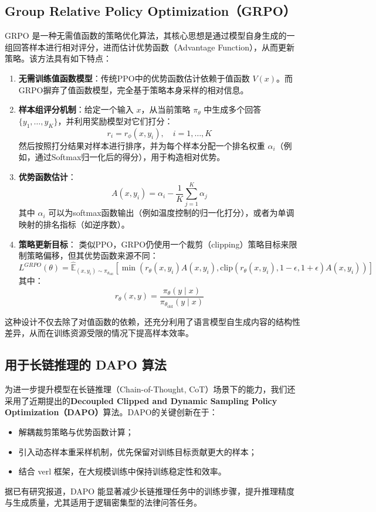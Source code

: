 \documentclass{pkuthesis}
\begin{document}
\subsection{Group Relative Policy Optimization（GRPO）}
GRPO 是一种无需值函数的策略优化算法，其核心思想是通过模型自身生成的一组回答样本进行相对评分，进而估计优势函数（Advantage Function），从而更新策略。该方法具有如下特点：
\begin{enumerate}
    \item \textbf{无需训练值函数模型}：传统PPO中的优势函数估计依赖于值函数 $V(x)$。而GRPO摒弃了值函数模型，完全基于策略本身采样的相对信息。
    \item \textbf{样本组评分机制}：给定一个输入 $x$，从当前策略 $\pi_{\theta}$ 中生成多个回答 $\{y_1, \dots, y_K\}$，并利用奖励模型对它们打分：
    $$ r_i = r_{\phi}(x, y_i), \quad i = 1, \dots, K $$
    然后按照打分结果对样本进行排序，并为每个样本分配一个排名权重 $\alpha_i$（例如，通过Softmax归一化后的得分），用于构造相对优势。
    \item \textbf{优势函数估计}：
    $$ A(x, y_i) = \alpha_i - \frac{1}{K} \sum_{j=1}^K \alpha_j $$
    其中 $\alpha_i$ 可以为softmax函数输出（例如温度控制的归一化打分），或者为单调映射的排名指标（如逆序数）。
    \item \textbf{策略更新目标}：
    类似PPO，GRPO仍使用一个裁剪（clipping）策略目标来限制策略偏移，但其优势函数来源不同：
    $$ L^{GRPO}(\theta) = \hat{\mathbb{E}}_{(x,y_i) \sim \pi_{\theta_{\text{old}}}} \left[ \min(r_{\theta}(x,y_i)A(x,y_i), \text{clip}(r_{\theta}(x,y_i), 1-\epsilon, 1+\epsilon)A(x,y_i)) \right] $$
    其中：
    $$ r_{\theta}(x, y) = \frac{\pi_{\theta}(y \mid x)}{\pi_{\theta_{\text{old}}}(y \mid x)} $$
\end{enumerate}
这种设计不仅去除了对值函数的依赖，还充分利用了语言模型自生成内容的结构性差异，从而在训练资源受限的情况下提高样本效率。

\subsection{用于长链推理的 DAPO 算法}
为进一步提升模型在长链推理（Chain-of-Thought, CoT）场景下的能力，我们还采用了近期提出的\textbf{Decoupled Clipped and Dynamic Sampling Policy Optimization（DAPO）}算法。DAPO的关键创新在于：
\begin{itemize}
    \item 解耦裁剪策略与优势函数计算；
    \item 引入动态样本重采样机制，优先保留对训练目标贡献更大的样本；
    \item 结合 verl 框架，在大规模训练中保持训练稳定性和效率。
\end{itemize}
据已有研究报道，DAPO 能显著减少长链推理任务中的训练步骤，提升推理精度与生成质量，尤其适用于逻辑密集型的法律问答任务。
\end{document}
